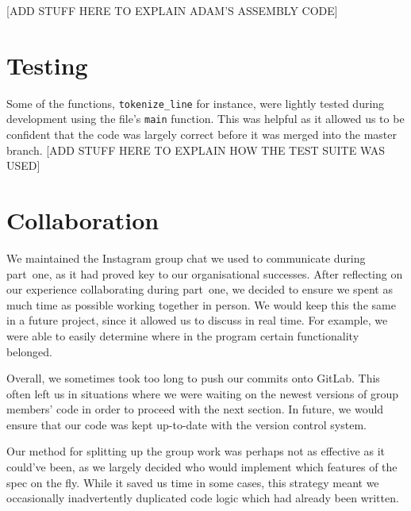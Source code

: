 \documentclass[11pt]{article}
\begin{document}
[ADD STUFF HERE TO EXPLAIN ADAM'S ASSEMBLY CODE]

\section{Testing}

Some of the functions, \texttt{tokenize\_line} for instance, were lightly tested during development using the file's \texttt{main} function. This was helpful as it allowed us to be confident that the code was largely correct before it was merged into the master branch. [ADD STUFF HERE TO EXPLAIN HOW THE TEST SUITE WAS USED]

\section{Collaboration}
We maintained the Instagram group chat we used to communicate during part~one, as it had proved key to our organisational successes. After reflecting on our experience collaborating during part~one, we decided to ensure we spent as much time as possible working together in person. We would keep this the same in a future project, since it allowed us to discuss in real time. For example, we were able to easily determine where in the program certain functionality belonged.

Overall, we sometimes took too long to push our commits onto GitLab. This often left us in situations where we were waiting on the newest versions of group members' code in order to proceed with the next section. In future, we would ensure that our code was kept up-to-date with the version control system.

Our method for splitting up the group work was perhaps not as effective as it could've been, as we largely decided who would implement which features of the spec on the fly. While it saved us time in some cases, this strategy meant we occasionally inadvertently duplicated code logic which had already been written.



\end{document}
